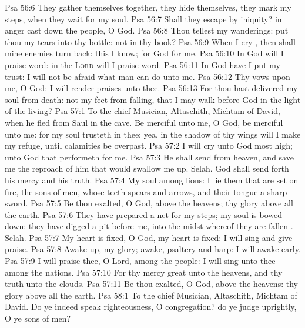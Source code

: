 \vs Psa 56:6 They gather themselves together, they hide themselves, they mark my steps, when they wait for my soul.
\vs Psa 56:7 Shall they escape by iniquity? in  anger cast down the people, O God.
\vs Psa 56:8 Thou tellest my wanderings: put thou my tears into thy bottle:  not in thy book?
\vs Psa 56:9 When I cry , then shall mine enemies turn back: this I know; for God  for me.
\vs Psa 56:10 In God will I praise  word: in the \textsc{Lord} will I praise  word.
\vs Psa 56:11 In God have I put my trust: I will not be afraid what man can do unto me.
\vs Psa 56:12 Thy vows  upon me, O God: I will render praises unto thee.
\vs Psa 56:13 For thou hast delivered my soul from death:  not  my feet from falling, that I may walk before God in the light of the living?
\vs Psa 57:1 To the chief Musician, Altaschith, Michtam of David, when he fled from Saul in the cave. Be merciful unto me, O God, be merciful unto me: for my soul trusteth in thee: yea, in the shadow of thy wings will I make my refuge, until  calamities be overpast.
\vs Psa 57:2 I will cry unto God most high; unto God that performeth  for me.
\vs Psa 57:3 He shall send from heaven, and save me  the reproach of him that would swallow me up. Selah. God shall send forth his mercy and his truth.
\vs Psa 57:4 My soul  among lions:  I lie  them that are set on fire,  the sons of men, whose teeth  spears and arrows, and their tongue a sharp sword.
\vs Psa 57:5 Be thou exalted, O God, above the heavens;  thy glory  above all the earth.
\vs Psa 57:6 They have prepared a net for my steps; my soul is bowed down: they have digged a pit before me, into the midst whereof they are fallen . Selah.
\vs Psa 57:7 My heart is fixed, O God, my heart is fixed: I will sing and give praise.
\vs Psa 57:8 Awake up, my glory; awake, psaltery and harp: I  will awake early.
\vs Psa 57:9 I will praise thee, O Lord, among the people: I will sing unto thee among the nations.
\vs Psa 57:10 For thy mercy  great unto the heavens, and thy truth unto the clouds.
\vs Psa 57:11 Be thou exalted, O God, above the heavens:  thy glory  above all the earth.
\vs Psa 58:1 To the chief Musician, Altaschith, Michtam of David. Do ye indeed speak righteousness, O congregation? do ye judge uprightly, O ye sons of men?
